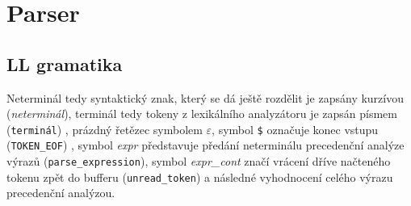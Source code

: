 \section{Parser}
\label{sec:parser}

\providecommand{\nt}[1]{\textit{#1}}
\providecommand{\tm}[1]{\texttt{#1}}


\subsection{LL gramatika}
\label{subsec:ll-gramatika}

Neterminál tedy syntaktický znak, který se dá ještě rozdělit je zapsány kurzívou (\nt{neterminál}), terminál tedy tokeny z lexikálního analyzátoru je zapsán písmem (\tm{terminál}) , prázdný řetězec symbolem $\varepsilon$, symbol \tm{\$} označuje konec vstupu (\texttt{TOKEN\_EOF}) , symbol \nt{expr} představuje předání neterminálu precedenční analýze výrazů (\texttt{parse\_expression}), symbol \nt{expr\_cont} značí vrácení dříve načteného tokenu zpět do bufferu (\texttt{unread\_token}) a následné vyhodnocení celého výrazu precedenční analýzou.


